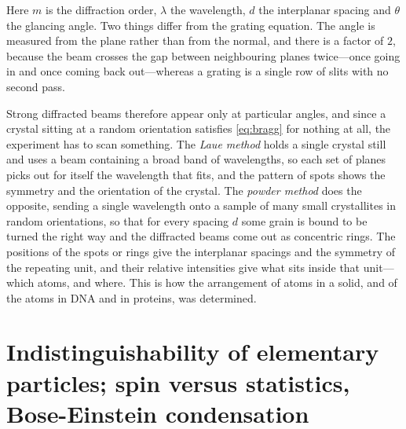         Here $m$ is the diffraction order, $\lambda$ the wavelength, $d$ the interplanar spacing and $\theta$ the glancing angle. Two things differ from the grating equation. The angle is measured from the plane rather than from the normal, and there is a factor of $2$, because the beam crosses the gap between neighbouring planes twice---once going in and once coming back out---whereas a grating is a single row of slits with no second pass.

        Strong diffracted beams therefore appear only at particular angles, and since a crystal sitting at a random orientation satisfies \cref{eq:bragg} for nothing at all, the experiment has to scan something. The \emph{Laue method} holds a single crystal still and uses a beam containing a broad band of wavelengths, so each set of planes picks out for itself the wavelength that fits, and the pattern of spots shows the symmetry and the orientation of the crystal. The \emph{powder method} does the opposite, sending a single wavelength onto a sample of many small crystallites in random orientations, so that for every spacing $d$ some grain is bound to be turned the right way and the diffracted beams come out as concentric rings. The positions of the spots or rings give the interplanar spacings and the symmetry of the repeating unit, and their relative intensities give what sits inside that unit---which atoms, and where. This is how the arrangement of atoms in a solid, and of the atoms in DNA and in proteins, was determined.

\section{Indistinguishability of elementary particles; spin versus statistics, Bose-Einstein condensation}
\label{sec:indistinguishability}

